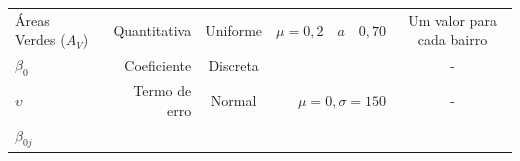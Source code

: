 \documentclass[
  a4paper, 12pt]{article}
\begin{document}
\begin{longtable}[]{@{}lrcrc@{}}
\begin{minipage}[t]{0.18\columnwidth}
Áreas Verdes (\(A_V\))\strut
\end{minipage} & \begin{minipage}[t]{0.12\columnwidth}\raggedleft
Quantitativa\strut
\end{minipage} & \begin{minipage}[t]{0.11\columnwidth}\centering
Uniforme\strut
\end{minipage} & \begin{minipage}[t]{0.25\columnwidth}\raggedleft
\(\mu = 0,2 \quad a \quad 0,70\)\strut
\end{minipage} & \begin{minipage}[t]{0.21\columnwidth}\centering
Um valor para cada bairro\strut
\end{minipage}\tabularnewline
\begin{minipage}[t]{0.18\columnwidth}\raggedright
\(\beta_{0}\)\strut
\end{minipage} & \begin{minipage}[t]{0.12\columnwidth}\raggedleft
Coeficiente\strut
\end{minipage} & \begin{minipage}[t]{0.11\columnwidth}\centering
Discreta\strut
\end{minipage} & \begin{minipage}[t]{0.25\columnwidth}\raggedleft
2000\strut
\end{minipage} & \begin{minipage}[t]{0.21\columnwidth}\centering
-\strut
\end{minipage}\tabularnewline
\begin{minipage}[t]{0.18\columnwidth}\raggedright
\(\upsilon\)\strut
\end{minipage} & \begin{minipage}[t]{0.12\columnwidth}\raggedleft
Termo de erro\strut
\end{minipage} & \begin{minipage}[t]{0.11\columnwidth}\centering
Normal\strut
\end{minipage} & \begin{minipage}[t]{0.25\columnwidth}\raggedleft
\(\mu = 0, \sigma = 150\)\strut
\end{minipage} & \begin{minipage}[t]{0.21\columnwidth}\centering
-\strut
\end{minipage}\tabularnewline
\begin{minipage}[t]{0.18\columnwidth}\raggedright
\(\beta_{0j}\)\strut
\end{minipage} & \begin{minipage}[t]{0.12\columnwidth}\raggedleft

\end{minipage}
\end{longtable}
\end{document}
